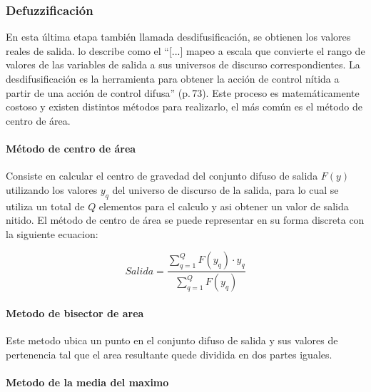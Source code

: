         \subsubsection{Defuzzificación}\label{secc:defuzzificacion}

            En esta última etapa también llamada desdifusificación, se obtienen los valores reales de salida. \textcite{cruz2010inteligencia} lo describe como el \enquote{[...] mapeo a escala que convierte el rango de valores de las variables de salida a sus universos de discurso correspondientes. La desdifusificación es la herramienta para obtener la acción de control nítida a partir de una acción de control difusa} (p.$\,$73). Este proceso es matemáticamente costoso y existen distintos métodos para realizarlo, el más común es el método de centro de área.
            
            \paragraph{Método de centro de área}

                Consiste en calcular el centro de gravedad del conjunto difuso de salida $F(y)$ utilizando los valores $y_q$ del universo de discurso de la salida, para lo cual se utiliza un total de $Q$ elementos para el calculo y asi obtener un valor de salida nitido. El método de centro de área se puede representar en su forma discreta con la siguiente ecuacion:

                \pagebreak
                
                \begin{equation}\label{eq:Centroide}
                    Salida = \frac{\displaystyle\sum\limits_{q=1}^{Q}F(y_q)\cdot y_q}{\displaystyle\sum\limits_{q=1}^{Q}F(y_q)}
                \end{equation}

            \paragraph{Metodo de bisector de area}
                
                Este metodo ubica un punto en el conjunto difuso de salida y sus valores de pertenencia tal que el area resultante quede dividida en dos partes iguales.

            \paragraph{Metodo de la media del maximo}
                
